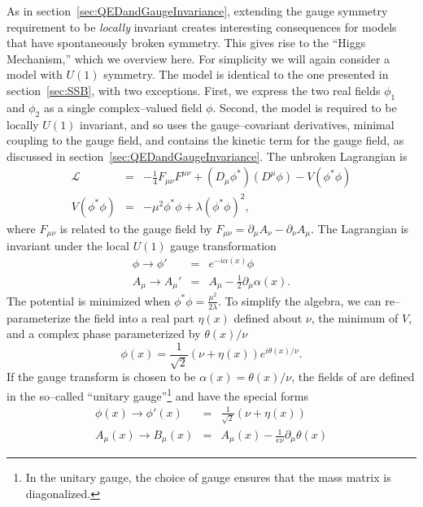 As in section~\ref{sec:QEDandGaugeInvariance}, extending the gauge symmetry
requirement to be \emph{locally} invariant creates interesting consequences for
models that have spontaneously broken symmetry.  This gives rise to the ``Higgs
Mechanism,'' which we overview here.  For simplicity we will again consider a
model with $U(1)$ symmetry.  The model is identical to the one presented in
section~\ref{sec:SSB}, with two exceptions. First, we express the two real
fields $\phi_1$ and $\phi_2$ as a single complex--valued field $\phi$.  Second,
the model is required to be locally $U(1)$ invariant, and so uses the
gauge--covariant derivatives, minimal coupling to the gauge field, and contains
the kinetic term for the gauge field, as discussed in
section~\ref{sec:QEDandGaugeInvariance}.  The unbroken Lagrangian is
\begin{eqnarray}
  \mathcal{L} &=& -\frac{1}{4} F_{\mu\nu}F^{\mu\nu} 
  + (D_\mu \phi^*)(D^\mu \phi) - V(\phi^*\phi) \label{eq:LocalInvariantU1} \\
  V(\phi^*\phi) &=& -\mu^2 \phi^*\phi + \lambda (\phi^*\phi)^2,
  \label{eq:PotentialLocalInvariantU1}
\end{eqnarray}
where $F_{\mu\nu}$ is related to the gauge field by $F_{\mu\nu} = \partial_\mu
A_\nu - \partial_\nu A_\mu$.  The Lagrangian is invariant under the local $U(1)$
gauge transformation
\begin{eqnarray}
  \phi \to \phi' &=& e^{-i \alpha(x)} \phi \nonumber \\
  A_\mu \to A_\mu' &=& A_\mu - \frac{1}{2} \partial_\mu \alpha(x).
\end{eqnarray}
The potential is minimized when $\phi^*\phi = \frac{\mu^2}{2\lambda}$.  To
simplify the algebra, we can
re--parameterize the field into a real part $\eta(x)$ defined about $\nu$, the minimum of $V$, 
and a complex phase parameterized by $\theta(x)/\nu$
\begin{equation}
  \phi(x) = \frac{1}{\sqrt 2}(\nu + \eta(x))e^{i \theta(x)/\nu}.
  \label{eq:HiggsMechanismFieldParameterization}
\end{equation}
If the gauge transform is chosen to be $\alpha(x) = \theta(x)/\nu$, the fields
of are defined in the
so--called ``unitary gauge''\footnote{In the unitary gauge, the choice of gauge
ensures that the mass matrix is diagonalized.} and have the special forms
\begin{eqnarray}
  \phi(x) \to \phi'(x) &=& \frac{1}{\sqrt 2}(\nu + \eta(x)) \nonumber \\
  A_\mu(x) \to B_\mu(x) &=& A_\mu(x) - \frac{1}{e \nu}\partial_\mu \theta(x)
  \label{eq:AfterUnitaryGaugeTransformation}
\end{eqnarray}
